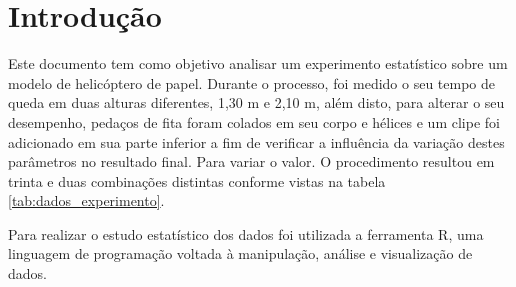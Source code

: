 \documentclass[
12pt,					%
openright,				%
oneside,				%
a4paper,				%
english,
brazil
]{ABNT/abntex2_report}
\begin{document}
	\setlength\beforechapskip{-24pt}
	\setlength\afterchapskip{12pt}
	\textual
	\pagestyle{plain}
	\normalsize
	\justify
	\normalfont


\section*{Introdução}

Este documento tem como objetivo analisar um experimento estatístico sobre um modelo de helicóptero de papel. 
Durante o processo, foi medido o seu tempo de queda em duas alturas diferentes, 1,30 m e 2,10 m, 
 além disto, 
para alterar o seu desempenho, pedaços de fita foram colados em seu corpo e hélices e um clipe foi adicionado em sua parte inferior a fim de verificar a influência da variação destes parâmetros no resultado final. Para variar o valor. 
O procedimento resultou em trinta e duas combinações distintas conforme vistas na tabela \ref{tab:dados_experimento}.

Para realizar o estudo estatístico dos dados foi utilizada a ferramenta R, uma linguagem de programação voltada à manipulação, 
análise e visualização de dados.
\end{document}
